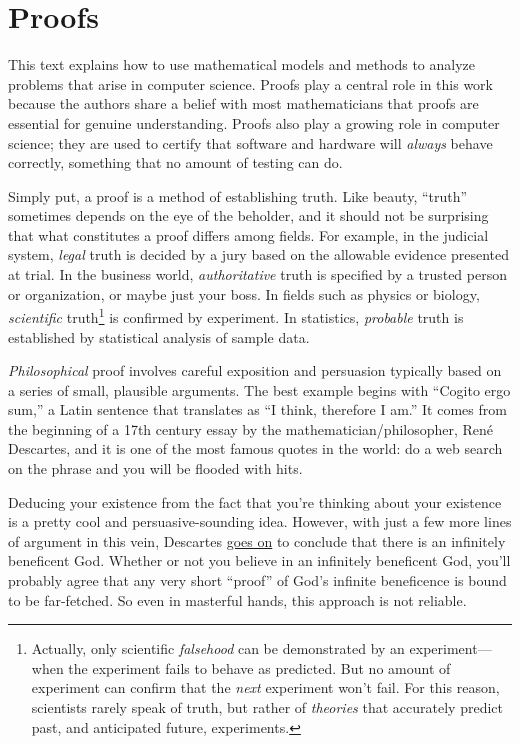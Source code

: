 \part{Proofs}
\label{part:proofs}

\partintro

This text explains how to use mathematical models and methods to analyze
problems that arise in computer science.  Proofs play a central role in
this work because the authors share a belief with  most mathematicians that proofs are
essential for genuine understanding.  Proofs also play a growing role in
computer science; they are used to certify that software and hardware will
\emph{always} behave correctly, something that no amount of testing can
do.

Simply put, a proof is a method of establishing truth.  Like beauty,
``truth'' sometimes depends on the eye of the beholder, and it should
not be surprising that what constitutes a proof differs among fields.
For example, in the judicial system, \emph{legal} truth is decided by
a jury based on the allowable evidence presented at trial.  In the
business world, \emph{authoritative} truth is specified by a trusted
person or organization, or maybe just your boss.  In fields such as
physics or biology, \emph{scientific} truth\footnote{Actually, only
  scientific \emph{falsehood} can be demonstrated by an
  experiment---when the experiment fails to behave as predicted.  But
  no amount of experiment can confirm that the \emph{next} experiment
  won't fail.  For this reason, scientists rarely speak of truth, but
  rather of \emph{theories} that accurately predict past, and
  anticipated future, experiments.} is confirmed by experiment.  In statistics,
\emph{probable} truth is established by statistical analysis of sample
data.

\emph{Philosophical} proof involves careful exposition and
persuasion typically based on a series of small, plausible arguments.
The best example begins with ``Cogito ergo sum,'' a Latin sentence
that translates as ``I think, therefore I am.''  It comes from the
beginning of a 17th century essay by the mathematician/philosopher,
Ren\'e Descartes, and it is one of the most famous quotes in the
world: do a web search on the phrase and you will be flooded with
hits.

Deducing your existence from the fact that you're thinking about your
existence is a pretty cool and persuasive-sounding idea.  However,
with just a few more lines of argument in this vein, Descartes
\href{http://www.btinternet.com/~glynhughes/squashed/descartes.htm}{goes
  on} to conclude that there is an infinitely beneficent God.  Whether
or not you believe in an infinitely beneficent God, you'll probably
agree that any very short ``proof'' of God's infinite beneficence is
bound to be far-fetched.  So even in masterful hands, this approach is
not reliable.

